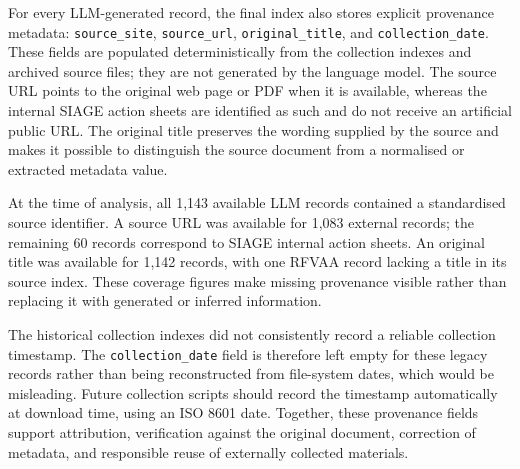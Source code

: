 
For every LLM-generated record, the final index also stores explicit provenance
metadata: \texttt{source\_site}, \texttt{source\_url},
\texttt{original\_title}, and \texttt{collection\_date}. These fields are
populated deterministically from the collection indexes and archived source
files; they are not generated by the language model. The source URL points to
the original web page or PDF when it is available, whereas the internal SIAGE
action sheets are identified as such and do not receive an artificial public
URL. The original title preserves the wording supplied by the source and makes
it possible to distinguish the source document from a normalised or extracted
metadata value.

At the time of analysis, all 1,143 available LLM records contained a
standardised source identifier. A source URL was available for 1,083 external
records; the remaining 60 records correspond to SIAGE internal action sheets.
An original title was available for 1,142 records, with one RFVAA record lacking
a title in its source index. These coverage figures make missing provenance
visible rather than replacing it with generated or inferred information.

The historical collection indexes did not consistently record a reliable
collection timestamp. The \texttt{collection\_date} field is therefore left
empty for these legacy records rather than being reconstructed from file-system
dates, which would be misleading. Future collection scripts should record the
timestamp automatically at download time, using an ISO 8601 date. Together,
these provenance fields support attribution, verification against the original
document, correction of metadata, and responsible reuse of externally collected
materials.
